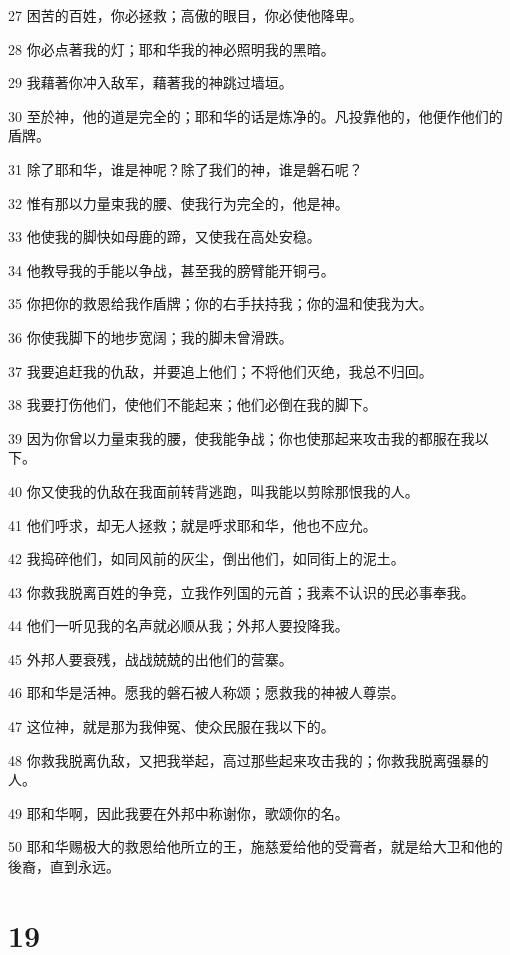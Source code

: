 \par 27 困苦的百姓，你必拯救；高傲的眼目，你必使他降卑。
\par 28 你必点著我的灯；耶和华我的神必照明我的黑暗。
\par 29 我藉著你冲入敌军，藉著我的神跳过墙垣。
\par 30 至於神，他的道是完全的；耶和华的话是炼净的。凡投靠他的，他便作他们的盾牌。
\par 31 除了耶和华，谁是神呢？除了我们的神，谁是磐石呢？
\par 32 惟有那以力量束我的腰、使我行为完全的，他是神。
\par 33 他使我的脚快如母鹿的蹄，又使我在高处安稳。
\par 34 他教导我的手能以争战，甚至我的膀臂能开铜弓。
\par 35 你把你的救恩给我作盾牌；你的右手扶持我；你的温和使我为大。
\par 36 你使我脚下的地步宽阔；我的脚未曾滑跌。
\par 37 我要追赶我的仇敌，并要追上他们；不将他们灭绝，我总不归回。
\par 38 我要打伤他们，使他们不能起来；他们必倒在我的脚下。
\par 39 因为你曾以力量束我的腰，使我能争战；你也使那起来攻击我的都服在我以下。
\par 40 你又使我的仇敌在我面前转背逃跑，叫我能以剪除那恨我的人。
\par 41 他们呼求，却无人拯救；就是呼求耶和华，他也不应允。
\par 42 我捣碎他们，如同风前的灰尘，倒出他们，如同街上的泥土。
\par 43 你救我脱离百姓的争竞，立我作列国的元首；我素不认识的民必事奉我。
\par 44 他们一听见我的名声就必顺从我；外邦人要投降我。
\par 45 外邦人要衰残，战战兢兢的出他们的营寨。
\par 46 耶和华是活神。愿我的磐石被人称颂；愿救我的神被人尊崇。
\par 47 这位神，就是那为我伸冤、使众民服在我以下的。
\par 48 你救我脱离仇敌，又把我举起，高过那些起来攻击我的；你救我脱离强暴的人。
\par 49 耶和华啊，因此我要在外邦中称谢你，歌颂你的名。
\par 50 耶和华赐极大的救恩给他所立的王，施慈爱给他的受膏者，就是给大卫和他的後裔，直到永远。

\chapter{19}

